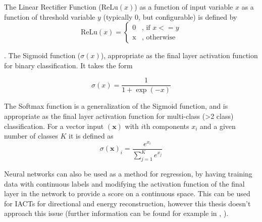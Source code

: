 The Linear Rectifier Function ($\textrm{ReLu}(x)$) as a function of input variable $x$ as a function of threshold variable $y$ (typically 0, but configurable) is defined by
\begin{equation}
    \textrm{ReLu}(x)=\begin{cases}\mbox{0} & \mbox{, if } x <= y \\ \mbox{x} & \mbox{, otherwise} \end{cases}
\end{equation}

\cite{Keras}. The Sigmoid function ($\sigma(x)$), appropriate as the final layer activation function for binary classification. It takes the form

\begin{equation}
    \sigma(x)=\frac{1}{1+\exp(-x)}
\end{equation}

The Softmax function is a generalization of the Sigmoid function, and is appropriate as the final layer activation function for multi-class (>2 class) classification. For a vector input $(\textbf{x})$ with $i$th components $x_i $ and a given number of classes $K$ it is defined as
\begin{equation}
    \sigma(\textbf{x})_i=\frac{e^{x_i}}{\sum_{j=1}^K e^{x_j}}
\end{equation}

Neural networks can also be used as a method for regression, by having training data with continuous labels and modifying the activation function of the final layer in the network to provide a score on a continuous space. This can be used for IACTs for directional and energy reconstruction, however this thesis doesn't approach this issue (further information can be found for example in \cite{mikaelphd}, \cite{tjarkicrc}).  

